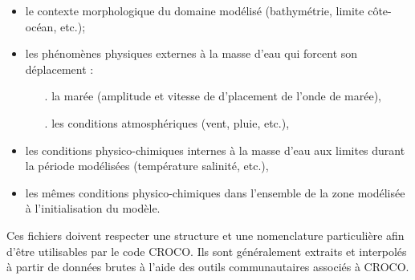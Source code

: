\documentclass[10pt,a4paper,titlepage]{article}
\begin{document}
\begin{itemize}
    \item le contexte morphologique du domaine modélisé (bathymétrie, limite côte-océan, etc.);
    \item les phénomènes physiques externes à la masse d'eau qui forcent son déplacement :
    \begin{itemize}
        \item[.] la marée (amplitude et vitesse de d'placement de l'onde de marée),
        \item[.] les conditions atmosphériques (vent, pluie, etc.),
    \end{itemize}
    \item les conditions physico-chimiques internes à la masse d'eau aux limites durant la période modélisées (température salinité, etc.),
    \item les mêmes conditions physico-chimiques dans l'ensemble de la zone modélisée à l'initialisation du modèle.
\end{itemize}
Ces fichiers doivent respecter une structure et une nomenclature particulière afin d'être utilisables par le code CROCO.
Ils sont généralement extraits et interpolés à partir de données brutes à l'aide des outils communautaires associés à CROCO.
\end{document}
